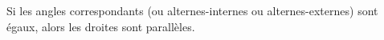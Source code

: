 Si les angles correspondants (ou alternes-internes ou
alternes-externes) sont égaux, alors les droites sont parallèles.